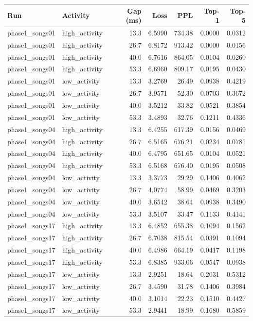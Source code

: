 \begin{tabular}{llrrrrr}
\toprule
Run & Activity & Gap (ms) & Loss & PPL & Top-1 & Top-5 \\
\midrule
phase1\_songs01 & high\_activity & 13.3 & 6.5990 & 734.38 & 0.0000 & 0.0312 \\
phase1\_songs01 & high\_activity & 26.7 & 6.8172 & 913.42 & 0.0000 & 0.0156 \\
phase1\_songs01 & high\_activity & 40.0 & 6.7616 & 864.05 & 0.0104 & 0.0260 \\
phase1\_songs01 & high\_activity & 53.3 & 6.6960 & 809.17 & 0.0195 & 0.0430 \\
phase1\_songs01 & low\_activity & 13.3 & 3.2769 & 26.49 & 0.0938 & 0.4219 \\
phase1\_songs01 & low\_activity & 26.7 & 3.9571 & 52.30 & 0.0703 & 0.3672 \\
phase1\_songs01 & low\_activity & 40.0 & 3.5212 & 33.82 & 0.0521 & 0.3854 \\
phase1\_songs01 & low\_activity & 53.3 & 3.4893 & 32.76 & 0.1211 & 0.4336 \\
phase1\_songs04 & high\_activity & 13.3 & 6.4255 & 617.39 & 0.0156 & 0.0469 \\
phase1\_songs04 & high\_activity & 26.7 & 6.5165 & 676.21 & 0.0234 & 0.0781 \\
phase1\_songs04 & high\_activity & 40.0 & 6.4795 & 651.65 & 0.0104 & 0.0521 \\
phase1\_songs04 & high\_activity & 53.3 & 6.5168 & 676.40 & 0.0195 & 0.0508 \\
phase1\_songs04 & low\_activity & 13.3 & 3.3773 & 29.29 & 0.1406 & 0.4062 \\
phase1\_songs04 & low\_activity & 26.7 & 4.0774 & 58.99 & 0.0469 & 0.3203 \\
phase1\_songs04 & low\_activity & 40.0 & 3.6542 & 38.64 & 0.0938 & 0.3490 \\
phase1\_songs04 & low\_activity & 53.3 & 3.5107 & 33.47 & 0.1133 & 0.4141 \\
phase1\_songs17 & high\_activity & 13.3 & 6.4852 & 655.38 & 0.1094 & 0.1562 \\
phase1\_songs17 & high\_activity & 26.7 & 6.7038 & 815.54 & 0.0391 & 0.1094 \\
phase1\_songs17 & high\_activity & 40.0 & 6.4986 & 664.19 & 0.0417 & 0.1198 \\
phase1\_songs17 & high\_activity & 53.3 & 6.8385 & 933.06 & 0.0547 & 0.0938 \\
phase1\_songs17 & low\_activity & 13.3 & 2.9251 & 18.64 & 0.2031 & 0.5312 \\
phase1\_songs17 & low\_activity & 26.7 & 3.4590 & 31.78 & 0.1406 & 0.3984 \\
phase1\_songs17 & low\_activity & 40.0 & 3.1014 & 22.23 & 0.1510 & 0.4427 \\
phase1\_songs17 & low\_activity & 53.3 & 2.9441 & 18.99 & 0.1680 & 0.5859 \\
\bottomrule
\end{tabular}
